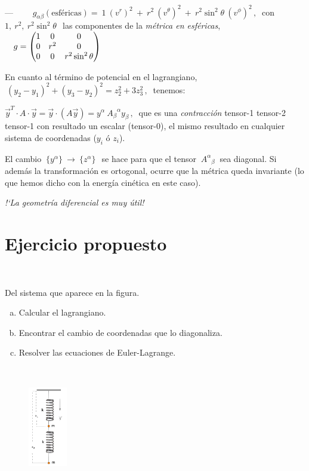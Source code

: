 \begin{ejemplo}
\begin{adjustwidth}{20pt}{20pt}
--- $\qquad g_{\alpha \beta} (\text{esféricas})= \ 1 \ (v^r)^2 \  + \ r^2\ (v^\theta)^2  \ + \ r^2 \sin^2 \theta  \ (v^\phi)^2\, ,\ $ con  $1,\ r^2,\ r^2 \sin^2 \theta \, \ $ las componentes de la \emph{métrica en esféricas}, $\quad g=\mqty(1&0&0\\0&r^2&0\\0&0&r^2\sin^2 \theta)$
\end{adjustwidth}
En cuanto al término de potencial en el lagrangiano, $\ (y_2-y_1)^2+(y_3-y_2)^2=z_2^2+3z_3^2\, ,\ $ tenemos:

$\overrightarrow y^T  \cdot A \cdot \overrightarrow y =\overrightarrow y \cdot (A \overrightarrow y) =
y^\alpha \ {A_\beta}^\alpha  y_\beta \, , \ $ que es una \emph{contracción} tensor-1 tensor-2 tensor-1 con resultado un escalar (tensor-0), el mismo resultado en cualquier sistema de coordenadas ($y_i \text{ ó } z_i$).

El cambio $\ \{y^\alpha \} \ \to \ \{ z^\alpha \} \, \ $ se hace para que el tensor $\ {A^\alpha}_\beta \ $ sea diagonal. Si además la transformación es ortogonal, ocurre que la métrica queda invariante (lo que hemos dicho con la energía cinética en este caso).
\begin{center}\emph{!`La geometría diferencial es muy útil!}\end{center}
\end{ejemplo}

\vspace{0.5cm}
\section{Ejercicio propuesto}
\vspace{0.5cm}

\begin{ejercicio}
\begin{adjustwidth}{20pt}{20pt}
\begin{multicols}{2}
$\,$
	
Del sistema que aparece en la figura.
\begin{enumerate}[a) ]
\item Calcular el lagrangiano.
\item Encontrar el cambio de coordenadas que lo diagonaliza.
\item Resolver las ecuaciones de Euler-Lagrange.	
\end{enumerate}

$\,$
\begin{figure}[H]
		\centering
		\includegraphics[width=0.15\textwidth]{imagenes/img06-04.png}
	\end{figure}
\end{multicols}
\end{adjustwidth}	
\end{ejercicio}

